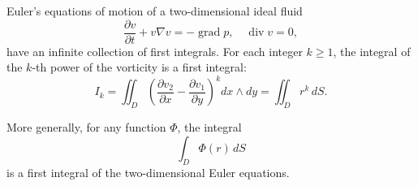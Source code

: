 Euler's equations of motion of a two-dimensional ideal fluid
$$\frac{\partial v}{\partial t} + v \nabla v = -\operatorname{grad} p, \quad \operatorname{div} v = 0,$$
have an infinite collection of first integrals. For each integer $k \geq 1$, the integral of the $k$-th power of the vorticity is a first integral:
$$I_k = \iint_D \left( \frac{\partial v_2}{\partial x} - \frac{\partial v_1}{\partial y} \right)^k dx \wedge dy = \iint_D r^k \, dS.$$

More generally, for any function $\Phi$, the integral
$$\int_D \Phi(r) \, dS$$
is a first integral of the two-dimensional Euler equations.
